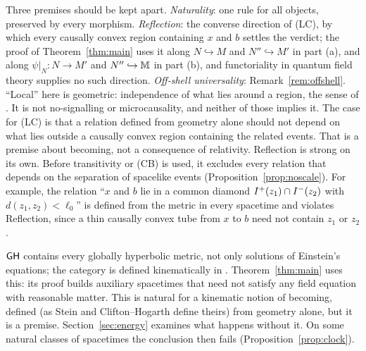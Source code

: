 \begin{remark}\label{rem:lc}
Three premises should be kept apart. \emph{Naturality}: one rule for all
objects, preserved by every morphism. \emph{Reflection}: the converse
direction of (LC), by which every causally convex region containing $x$ and
$b$ settles the verdict; the proof of Theorem~\ref{thm:main} uses it along $N\hookrightarrow M$ and $N''\hookrightarrow M'$ in part (a), and along $\psi|_N:N\to M'$ and $N''\hookrightarrow\mathbb M$ in part (b), and functoriality in quantum
field theory supplies no such direction. \emph{Off-shell universality}:
Remark~\ref{rem:offshell}. ``Local'' here is geometric: independence of what
lies around a region, the sense of \citet[\S1]{BFV2003}. It is not
no-signalling or microcausality, and neither of those implies it. The case for
(LC) is that a relation defined from geometry alone should not depend on what
lies outside a causally convex region containing the related events. That is
a premise about becoming, not a consequence of relativity. Reflection is
strong on its own. Before transitivity or (CB) is used, it excludes every
relation that depends on the separation of spacelike events
(Proposition~\ref{prop:noscale}). For example, the relation ``$x$ and $b$ lie
in a common diamond $I^{+}(z_1)\cap I^{-}(z_2)$ with $d(z_1,z_2)<\ell_0$'' is
defined from the metric in every spacetime and violates Reflection, since a
thin causally convex tube from $x$ to $b$ need not contain $z_1$ or $z_2$.
\end{remark}

\begin{remark}\label{rem:offshell}
$\mathsf{GH}$ contains every globally hyperbolic metric, not only solutions of
Einstein's equations; the category is defined kinematically in
\citep{BFV2003,FV2012}. Theorem~\ref{thm:main} uses this: its proof builds
auxiliary spacetimes that need not satisfy any field equation with reasonable
matter. This is natural for a kinematic notion of becoming, defined (as Stein
and Clifton--Hogarth define theirs) from geometry alone, but it is a premise.
Section~\ref{sec:energy} examines what happens without it. On some natural
classes of spacetimes the conclusion then fails
(Proposition~\ref{prop:clock}).
\end{remark}
